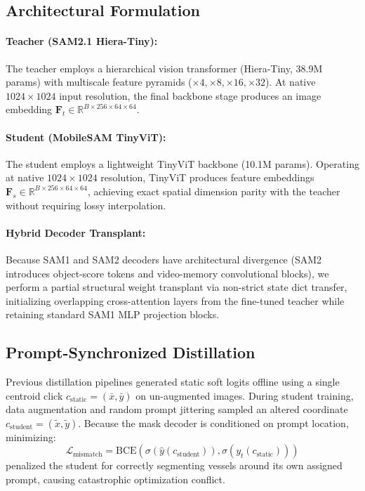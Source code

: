 \documentclass[10pt,twocolumn]{article}
\begin{document}
\subsection{Architectural Formulation}

\paragraph{Teacher (SAM2.1 Hiera-Tiny):}
The teacher employs a hierarchical vision transformer (Hiera-Tiny, 38.9M params) with multiscale feature pyramids ($\times 4, \times 8, \times 16, \times 32$). At native $1024\times 1024$ input resolution, the final backbone stage produces an image embedding $\mathbf{F}_t \in \mathbb{R}^{B \times 256 \times 64 \times 64}$.

\paragraph{Student (MobileSAM TinyViT):}
The student employs a lightweight TinyViT backbone (10.1M params). Operating at native $1024\times 1024$ resolution, TinyViT produces feature embeddings $\mathbf{F}_s \in \mathbb{R}^{B \times 256 \times 64 \times 64}$, achieving exact spatial dimension parity with the teacher without requiring lossy interpolation.

\paragraph{Hybrid Decoder Transplant:}
Because SAM1 and SAM2 decoders have architectural divergence (SAM2 introduces object-score tokens and video-memory convolutional blocks), we perform a partial structural weight transplant via non-strict state dict transfer, initializing overlapping cross-attention layers from the fine-tuned teacher while retaining standard SAM1 MLP projection blocks.

\subsection{Prompt-Synchronized Distillation}

Previous distillation pipelines generated static soft logits offline using a single centroid click $c_{\text{static}} = (\bar{x}, \bar{y})$ on un-augmented images. During student training, data augmentation and random prompt jittering sampled an altered coordinate $c_{\text{student}} = (\tilde{x}, \tilde{y})$. Because the mask decoder is conditioned on prompt location, minimizing:
\begin{equation}
    \mathcal{L}_{\text{mismatch}} = \text{BCE}\left(\sigma(\hat{y}(c_{\text{student}})), \sigma(y_t(c_{\text{static}}))\right)
\end{equation}
penalized the student for correctly segmenting vessels around its own assigned prompt, causing catastrophic optimization conflict.
\end{document}

